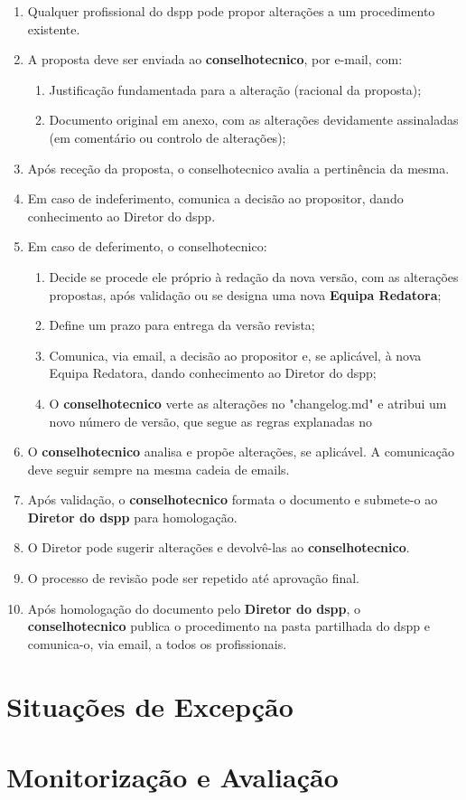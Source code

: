 \begin{enumerate}
  \item Qualquer profissional do \gls{dspp} pode propor alterações a um procedimento existente.
  \item A proposta deve ser enviada ao \textbf{\gls{conselhotecnico}}, por e-mail, com:
  \begin{enumerate}
    \item Justificação fundamentada para a alteração (racional da proposta);
    \item Documento original em anexo, com as alterações devidamente assinaladas (em comentário ou controlo de alterações);
  \end{enumerate}
  \item Após receção da proposta, o \gls{conselhotecnico} avalia a pertinência da mesma.
  \item Em caso de indeferimento, comunica a decisão ao propositor, dando conhecimento ao Diretor do \gls{dspp}.
  \item Em caso de deferimento, o \gls{conselhotecnico}:
  \begin{enumerate}
    \item Decide se procede ele próprio à redação da nova versão, com as alterações propostas, após validação ou se designa uma nova \textbf{Equipa Redatora};
    \item Define um prazo para entrega da versão revista;
    \item Comunica, via email, a decisão ao propositor e, se aplicável, à nova Equipa Redatora, dando conhecimento ao Diretor do \gls{dspp};
    \item O \textbf{\gls{conselhotecnico}} verte as alterações no "changelog.md" e atribui um novo número de versão, que segue as regras explanadas no 
  \end{enumerate}
  \item O \textbf{\gls{conselhotecnico}} analisa e propõe alterações, se aplicável. A comunicação deve seguir sempre na mesma cadeia de emails.
  \item Após validação, o \textbf{\gls{conselhotecnico}} formata o documento e submete-o ao \textbf{Diretor do \gls{dspp}} para homologação.
  \item O Diretor pode sugerir alterações e devolvê-las ao \textbf{\gls{conselhotecnico}}.
  \item O processo de revisão pode ser repetido até aprovação final.
  \item Após homologação do documento pelo \textbf{Diretor do \gls{dspp}}, o \textbf{\gls{conselhotecnico}} publica o procedimento na pasta partilhada do \gls{dspp} e comunica-o, via email, a todos os profissionais.
\end{enumerate}


\section{Situações de Excepção}\label{sec:situacoes-de-excepcao}


\section{Monitorização e Avaliação}\label{sec:monitorizacao-e-avaliacao}

